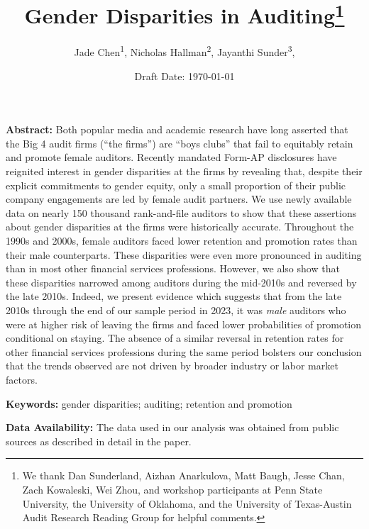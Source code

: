 \documentclass[11pt]{article}
\title{Gender Disparities in Auditing\footnote{We thank Dan Sunderland, Aizhan Anarkulova, Matt Baugh, Jesse Chan, Zach Kowaleski, Wei Zhou, and workshop participants at Penn State University, the University of Oklahoma, and the University of Texas-Austin Audit Research Reading Group for helpful comments.}}
\author{
    \vspace{.5cm}Jade Chen\textsuperscript{1}, 
    Nicholas Hallman\textsuperscript{2}, 
    Jayanthi Sunder\textsuperscript{3}, 
}
\affil{\vspace{.5cm}\textsuperscript{1}Loyola Marymount University}
\affil{\textsuperscript{2}The University of Texas at Austin and the Salem Center for Policy}
\affil{\textsuperscript{3}The University of Arizona}
\date{Draft Date: \today}
\begin{document}



% 

% 

% 


\maketitle %


\noindent
\textbf{Abstract:} Both popular media and academic research have long asserted that the Big 4 audit firms (``the firms'') are ``boys clubs'' that fail to equitably retain and promote female auditors. Recently mandated Form-AP disclosures have reignited interest in gender disparities at the firms by revealing that, despite their explicit commitments to gender equity, only a small proportion of their public company engagements are led by female audit partners. We use newly available data on nearly 150 thousand rank-and-file auditors to show that these assertions about gender disparities at the firms were historically accurate. Throughout the 1990s and 2000s, female auditors faced lower retention and promotion rates than their male counterparts. These disparities were even more pronounced in auditing than in most other financial services professions. However, we also show that these disparities narrowed among auditors during the mid-2010s and reversed by the late 2010s. Indeed, we present evidence which suggests that from the late 2010s through the end of our sample period in 2023, it was \textit{male} auditors who were at higher risk of leaving the firms and faced lower probabilities of promotion conditional on staying. The absence of a similar reversal in retention rates for other financial services professions during the same period bolsters our conclusion that the trends observed are not driven by broader industry or labor market factors.

\vspace{5mm}
\noindent
\textbf{Keywords:} gender disparities; auditing; retention and promotion
    
\vspace{5mm}
\noindent
\textbf{Data Availability:} The data used in our analysis was obtained from public sources as described in detail in the paper. 
\end{document}
